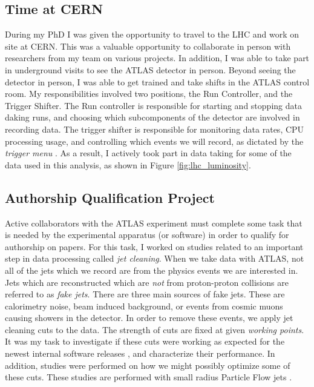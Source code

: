 \documentclass[12pt]{article}
\begin{document}
\subsection{Time at CERN}
During my PhD I was given the opportunity to travel to the LHC and work on site
at CERN. This was a valuable opportunity to collaborate in person with
researchers from my team on various projects. In addition, I was able to take
part in underground visits to see the ATLAS detector in person. Beyond seeing
the detector in person, I was able to get trained and take shifts in the ATLAS
control room. My responsibilities involved two positions, the Run Controller,
and the Trigger Shifter. The Run controller is responsible for starting and
stopping data daking runs, and choosing which subcomponents of the detector are
involved in recording data. The trigger shifter is responsible for monitoring
data rates, CPU processing usage, and controlling which events we will record,
as dictated by the \textit{trigger menu} \cite{trigger_2017, HLT_2016}. As a
result, I actively took part in data taking for some of the data used in this
analysis, as shown in Figure \ref{fig:lhc_luminosity}.



\subsection{Authorship Qualification Project}
Active collaborators with the ATLAS experiment must complete some task that is
needed by the experimental apparatus (or software) in order to qualify for
authorship on papers. For this task, I worked on studies related to an important
step in data processing called \textit{jet cleaning}. When we take data with
ATLAS, not all of the jets which we record are from the physics events we are
interested in. Jets which are reconstructed which are \textit{not} from
proton-proton collisions are referred to as \textit{fake jets}. There are three
main sources of fake jets. These are calorimetry noise, beam induced background,
or events from cosmic muons causing showers in the detector. In order to remove
these events, we apply jet cleaning cuts to the data. The strength of cuts are
fixed at given \textit{working points}. It was my task to investigate if these
cuts were working as expected for the newest internal software releases
\cite{atlas_simulation}, and characterize their performance. In addition,
studies were performed on how we might possibly optimize some of these cuts.
These studies are performed with small radius Particle Flow jets
\cite{pflow_jets}.
\end{document}
